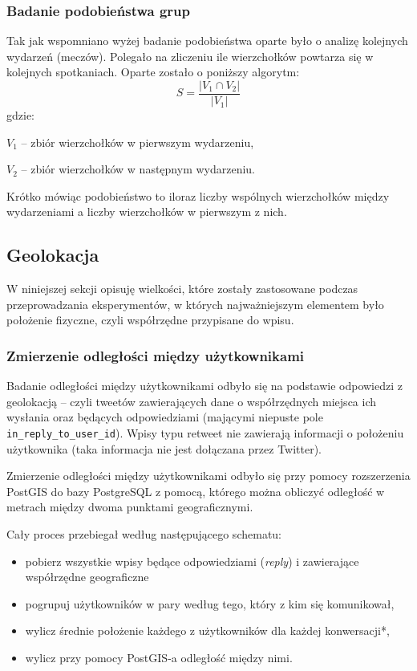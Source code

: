\subsubsection{Badanie podobieństwa grup}
\label{subsection:badaniepodobienstwagrup}
Tak jak wspomniano wyżej badanie podobieństwa oparte było o analizę kolejnych
wydarzeń (meczów).
Polegało na zliczeniu ile wierzchołków powtarza się w kolejnych spotkaniach.
Oparte zostało o poniższy algorytm:
\begin{equation}
S = \frac{|V_1 \cap V_2|}{|V_1|}
\end{equation}  
gdzie:

$V_1$ -- zbiór wierzchołków w pierwszym wydarzeniu,

$V_2$ -- zbiór wierzchołków w następnym wydarzeniu.

Krótko mówiąc podobieństwo to iloraz liczby wspólnych wierzchołków między 
wydarzeniami a liczby wierzchołków w pierwszym z nich.







\subsection{Geolokacja}
W niniejszej sekcji opisuję wielkości, które zostały zastosowane podczas
przeprowadzania eksperymentów, w których najważniejszym elementem było położenie
fizyczne, czyli współrzędne przypisane do wpisu.

\subsubsection{Zmierzenie odległości między użytkownikami}
\label{subsubsection:zmierzenieodleglosci}


Badanie odległości między użytkownikami odbyło się na podstawie odpowiedzi z
geolokacją -- czyli tweetów zawierających dane o współrzędnych miejsca ich
wysłania oraz będących odpowiedziami (mającymi niepuste pole
\texttt{in\_reply\_to\_user\_id}). Wpisy typu retweet nie zawierają informacji
o położeniu użytkownika (taka informacja nie jest dołączana przez Twitter).

Zmierzenie odległości między użytkownikami odbyło się przy pomocy rozszerzenia
PostGIS do bazy PostgreSQL z pomocą, którego można obliczyć odległość w metrach
między dwoma punktami geograficznymi.

Cały proces przebiegał według następującego schematu:
\begin{itemize}
  \item pobierz wszystkie wpisy będące odpowiedziami (\textit{reply}) i
  zawierające współrzędne geograficzne
  \item pogrupuj użytkowników w pary według tego, który z kim się komunikował,
  \item wylicz średnie położenie każdego z użytkowników dla każdej konwersacji*,
  \item wylicz przy pomocy PostGIS-a odległość między nimi.
\end{itemize}

